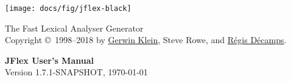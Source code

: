 \begin{center}
\texttt{[image: docs/fig/jflex-black]}

\sffamily
{\Large The Fast Lexical Analyser Generator}\\
\smallskip\smallskip
Copyright \copyright\ 1998--2018 by \href{http://www.doclsf.de}{Gerwin Klein},
Steve Rowe, and \href{http://regis.decamps.info/}{Régis Décamps}.

\vspace*{15ex}
{\Huge \sffamily \bfseries JFlex User's Manual}\\
\bigskip
Version 1.7.1-SNAPSHOT, {\today}
\end{center}
